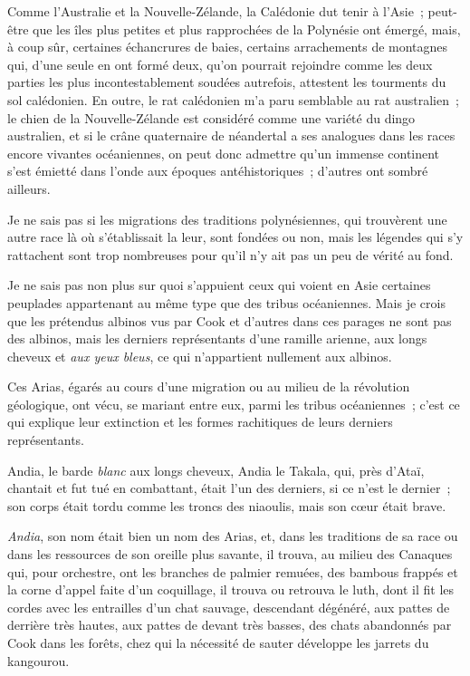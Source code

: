 \documentclass[french,twoside]{book} %
\begin{document}
Comme l’Australie et la Nouvelle-Zélande, la Calédonie dut tenir à l’Asie ; peut-être que les îles plus petites et plus rapprochées de la Polynésie ont émergé, mais, à coup sûr, certaines échancrures de baies, certains arrachements de montagnes qui, d’une seule en ont formé deux, qu’on pourrait rejoindre comme les deux parties les plus incontestablement soudées autrefois, attestent les tourments du sol calédonien. En  outre, le rat calédonien m’a paru semblable au rat australien ; le chien de la Nouvelle-Zélande est considéré comme une variété du dingo australien, et si le crâne quaternaire de néandertal a ses analogues dans les races encore vivantes océaniennes, on peut donc admettre qu’un immense continent s’est émietté dans l’onde aux époques antéhistoriques ; d’autres ont sombré ailleurs.\par
Je ne sais pas si les migrations des traditions polynésiennes, qui trouvèrent une autre race là où s’établissait la leur, sont fondées ou non, mais les légendes qui s’y rattachent sont trop nombreuses pour qu’il n’y ait pas un peu de vérité au fond.\par
Je ne sais pas non plus sur quoi s’appuient ceux qui voient en Asie certaines peuplades appartenant au même type que des tribus océaniennes. Mais je crois que les prétendus albinos vus par Cook et d’autres dans ces parages ne sont pas des albinos, mais les derniers représentants d’une ramille arienne, aux longs cheveux et \emph{aux yeux bleus}, ce qui n’appartient nullement aux albinos.\par
Ces Arias, égarés au cours d’une migration ou au milieu de la révolution géologique, ont vécu, se mariant entre eux, parmi les tribus océaniennes ;  c’est ce qui explique leur extinction et les formes rachitiques de leurs derniers représentants.\par
Andia, le barde \emph{blanc} aux longs cheveux, Andia le Takala, qui, près d’Ataï, chantait et fut tué en combattant, était l’un des derniers, si ce n’est le dernier ; son corps était tordu comme les troncs des niaoulis, mais son cœur était brave.\par
\emph{Andia}, son nom était bien un nom des Arias, et, dans les traditions de sa race ou dans les ressources de son oreille plus savante, il trouva, au milieu des Canaques qui, pour orchestre, ont les branches de palmier remuées, des bambous frappés et la corne d’appel faite d’un coquillage, il trouva ou retrouva le luth, dont il fit les cordes avec les entrailles d’un chat sauvage, descendant dégénéré, aux pattes de derrière très hautes, aux pattes de devant très basses, des chats abandonnés par Cook dans les forêts, chez qui la nécessité de sauter développe les jarrets du kangourou.\par
\end{document}
